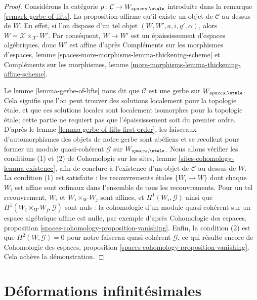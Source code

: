 \begin{proof}
Considérons la catégorie $p : \mathcal{C} \to W_{spaces, \etale}$
introduite dans la remarque \ref{remark-gerbe-of-lifts}.
La proposition affirme qu'il existe un objet de $\mathcal{C}$
au-dessus de $W$. En effet, si l'on dispose d'un tel objet
$(W, W', a, i, y', \alpha)$, alors $W = \mathcal{X} \times_{\mathcal{X}'} W'$.
Par conséquent, $W \to W'$ est un épaississement d'espaces algébriques, donc
$W'$ est affine d'après
Compléments sur les morphismes d'espaces, lemme
\ref{spaces-more-morphisms-lemma-thickening-scheme}
et Compléments sur les morphismes, lemme
\ref{more-morphisms-lemma-thickening-affine-scheme}.

\medskip\noindent
Le lemme \ref{lemma-gerbe-of-lifts} nous dit que $\mathcal{C}$ est une gerbe sur
$W_{spaces, \etale}$. Cela signifie que l'on peut trouver des solutions localement pour la topologie \'etale,
et que ces solutions locales sont localement isomorphes pour la topologie \'etale;
cette partie ne requiert pas que l'épaississement soit du premier ordre.
D'après le lemme \ref{lemma-gerbe-of-lifts-first-order},
les faisceaux d'automorphismes des objets de notre gerbe sont abéliens et
se recollent pour former un module quasi-cohérent $\mathcal{G}$
sur $W_{spaces, \etale}$. Nous allons vérifier les conditions (1) et (2)
de Cohomologie sur les sites, lemme \ref{sites-cohomology-lemma-existence},
afin de conclure à l'existence d'un objet de $\mathcal{C}$ au-dessus de $W$.
La condition (1) est satisfaite : les recouvrements \'etales $\{W_i \to W\}$
dont chaque $W_i$ est affine sont cofinaux dans l'ensemble de tous les recouvrements.
Pour un tel recouvrement, $W_i$ et $W_i \times_W W_j$ sont affines,
et $H^1(W_i, \mathcal{G})$ ainsi que $H^1(W_i \times_W W_j, \mathcal{G})$
sont nuls : la cohomologie d'un module quasi-cohérent sur un
espace algébrique affine est nulle, par exemple d'après Cohomologie des espaces, proposition
\ref{spaces-cohomology-proposition-vanishing}.
Enfin, la condition (2) est que $H^2(W, \mathcal{G}) = 0$
pour notre faisceau quasi-cohérent $\mathcal{G}$, ce qui résulte encore
de Cohomologie des espaces, proposition
\ref{spaces-cohomology-proposition-vanishing}.
Cela achève la démonstration.
\end{proof}






\section{Déformations infinitésimales}
\label{section-inf}

